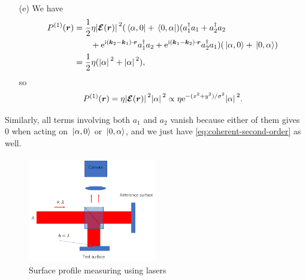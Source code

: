 \documentclass[hyperref, a4paper]{article}
\newcommand*{\ii}{\mathrm{i}}
\newcommand*{\ee}{\mathrm{e}}
\begin{document}
\begin{itemize}
\item[(e)] We have 
\[
    \begin{aligned}
        P^{(1)}(\vb*{r}) &= \frac{1}{2} \eta \abs*{\vb*{\mathcal{E}}(\vb*{r})}^2 (\bra*{\alpha, 0} + \bra*{0, \alpha}) (a_1^\dagger a_1 + a_2^\dagger a_2 \\
        &\quad \quad+ \ee^{\ii (\vb*{k}_2 - \vb*{k}_1) \cdot \vb*{r}} a_1^\dagger a_2 + \ee^{\ii (\vb*{k}_1 - \vb*{k}_2) \cdot \vb*{r}} a_2^\dagger a_1 ) (\ket*{\alpha, 0} + \ket*{0, \alpha}) \\
        &= \frac{1}{2} \eta (\abs*{\alpha}^2 + \abs*{\alpha}^2),
    \end{aligned}
\]
so 
\begin{equation}
    P^{(1)}(\vb*{r}) = \eta \abs*{\vb*{\mathcal{E}}(\vb*{r})}^2 \abs*{\alpha}^2 \propto \eta \ee^{- (x^2 + y^2) / \sigma^2} \abs*{\alpha}^2.
\end{equation}
\end{itemize}
Similarly, all terms involving both $a_1$ and $a_2$ vanish because either of them gives $0$ when acting on $\ket*{\alpha, 0}$ or $\ket*{0, \alpha}$, and we just have \eqref{eq:coherent-second-order} as well.

\paragraph{}

\begin{figure}
    \centering
    \includegraphics[width=0.5\textwidth]{problem-2.png}
    \caption{Surface profile measuring using lasers}
    \label{fig:prob-2}
\end{figure}
\end{document}
